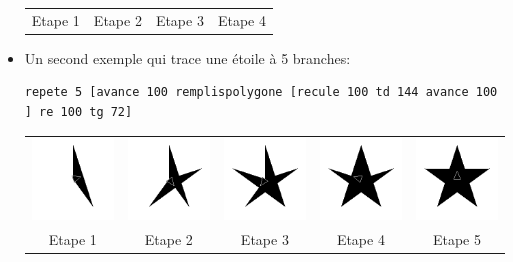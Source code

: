 \begin{itemize}
\begin{center}
\begin{tabular}{cccc}
Etape 1& Etape 2& Etape 3& Etape 4\\
\end{tabular}
\end{center}
\item Un second exemple qui trace une étoile à 5 branches:
\begin{verbatim}
repete 5 [avance 100 remplispolygone [recule 100 td 144 avance 100 ] re 100 tg 72]
\end{verbatim}
\begin{center}
 \begin{tabular}{ccccc}
 \includegraphics[width=3cm]{images/fillpolygon1.png}& \includegraphics[width=3cm]{images/fillpolygon2.png}& \includegraphics[width=3cm]{images/fillpolygon3.png}& \includegraphics[width=3cm]{images/fillpolygon4.png}& \includegraphics[width=3cm]{images/fillpolygon5.png}\\
Etape 1& Etape 2& Etape 3& Etape 4&Etape 5\\
\end{tabular}
\end{center}
\end{itemize}
